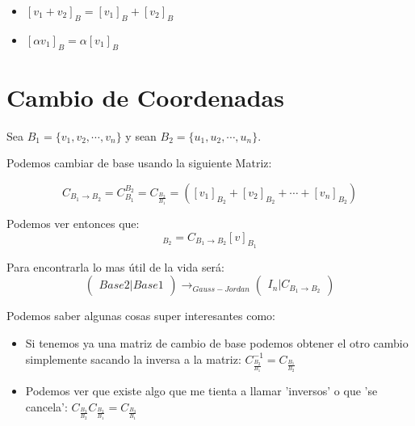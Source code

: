 \documentclass[12pt]{report}							    %
\begin{document}
        \begin{itemize}
            \item $[v_1 + v_2]_B = [v_1]_B + [v_2]_B$
            \item $[\alpha v_1]_B = \alpha [v_1]_B$
        \end{itemize}



    \clearpage
    \section{Cambio de Coordenadas}

        Sea $B_1 = \{v_1,v_2, \cdots, v_n\}$ y sean  $B_2 = \{u_1,u_2, \cdots, u_n\}$.

        Podemos cambiar de base usando la siguiente Matriz:

        \begin{equation*}
            C_{B_1 \to B_2}= C_{B_1}^{B_2} = C_{\frac{B_2}{B_1}} = \left( [v_1]_{B_2} + [v_2]_{B_2} + \cdots + [v_n]_{B_2}   \right)
        \end{equation*}

        Podemos ver entonces que:
        \begin{equation*}
            [v]_{B_2} = C_{B_1 \to B_2} [v]_{B_1}
        \end{equation*}

        Para encontrarla lo mas útil de la vida será:
        \begin{equation}
            \begin{pmatrix}  Base 2  \vert Base 1 \end{pmatrix} \to_{Gauss-Jordan}
            \begin{pmatrix}  I_n  \vert C_{B_1 \to B_2} \end{pmatrix}
        \end{equation}


        Podemos saber algunas cosas super interesantes como:
        \begin{itemize}
            \item Si tenemos ya una matriz de cambio de base podemos obtener el otro cambio simplemente sacando la inversa a la matriz:
            $ C^{-1}_{\frac{B_2}{B_1}} = C_{\frac{B_1}{B_2}} $
            
            \item Podemos ver que existe algo que me tienta a llamar 'inversos' o que 'se cancela': 
            $ C_{\frac{B_3}{B_2}} C_{\frac{B_2}{B_1}} = C_{\frac{B_3}{B_1}} $

        \end{itemize}
\end{document}
